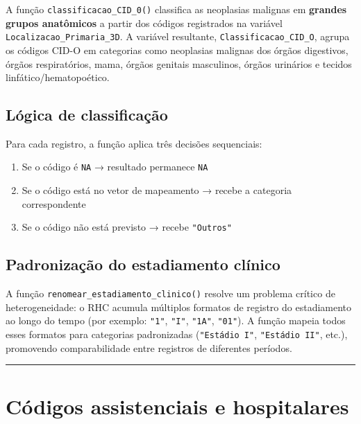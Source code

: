 \documentclass[
  brazilian,
  a4paper,
  oneside]{scrbook}
\providecommand{\tightlist}{%
  \setlength{\itemsep}{0pt}\setlength{\parskip}{0pt}}
\begin{document}
A função \texttt{classificacao\_CID\_0()} classifica as neoplasias
malignas em \textbf{grandes grupos anatômicos} a partir dos códigos
registrados na variável \texttt{Localizacao\_Primaria\_3D}. A variável
resultante, \texttt{Classificacao\_CID\_O}, agrupa os códigos CID-O em
categorias como neoplasias malignas dos órgãos digestivos, órgãos
respiratórios, mama, órgãos genitais masculinos, órgãos urinários e
tecidos linfático/hematopoético.

\subsection{Lógica de
classificação}\label{luxf3gica-de-classificauxe7uxe3o}

Para cada registro, a função aplica três decisões sequenciais:

\begin{enumerate}
\def\labelenumi{\arabic{enumi}.}
\tightlist
\item
  Se o código é \texttt{NA} → resultado permanece \texttt{NA}
\item
  Se o código está no vetor de mapeamento → recebe a categoria
  correspondente
\item
  Se o código não está previsto → recebe \texttt{"Outros"}
\end{enumerate}

\subsection{Padronização do estadiamento
clínico}\label{padronizauxe7uxe3o-do-estadiamento-cluxednico}

A função \texttt{renomear\_estadiamento\_clinico()} resolve um problema
crítico de heterogeneidade: o RHC acumula múltiplos formatos de registro
do estadiamento ao longo do tempo (por exemplo: \texttt{"1"},
\texttt{"I"}, \texttt{"1A"}, \texttt{"01"}). A função mapeia todos esses
formatos para categorias padronizadas (\texttt{"Estádio\ I"},
\texttt{"Estádio\ II"}, etc.), promovendo comparabilidade entre
registros de diferentes períodos.

\begin{center}\rule{0.5\linewidth}{0.5pt}\end{center}

\section{Códigos assistenciais e
hospitalares}\label{cuxf3digos-assistenciais-e-hospitalares}
\end{document}
